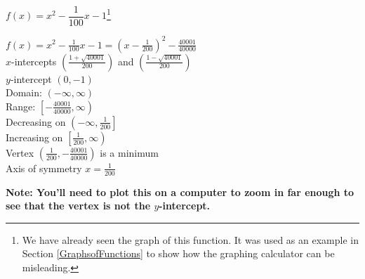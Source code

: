 {$f(x) = x^{2} - \dfrac{1}{100} x - 1$\footnote{We have already seen the graph of this function.  It was used as an example in Section \ref{GraphsofFunctions} to show how the graphing calculator can be misleading.}}
{$f(x) = x^{2} - \frac{1}{100} x - 1 = \left(x - \frac{1}{200}\right)^{2} - \frac{40001}{40000}$\\
$x$-intercepts $\left(\frac{1 + \sqrt{40001}}{200}\right)$ and $\left(\frac{1 - \sqrt{40001}}{200}\right)$\\
$y$-intercept $(0, -1)$\\
Domain: $(-\infty, \infty)$ \\
Range: $\left[-\frac{40001}{40000}, \infty \right)$ \\
Decreasing on $\left(-\infty, \frac{1}{200}\right]$ \\
Increasing on $\left[\frac{1}{200}, \infty \right)$ \\
Vertex $\left(\frac{1}{200}, -\frac{40001}{40000}\right)$ is a minimum\\
Axis of symmetry $x = \frac{1}{200}$

\begin{center}
\end{center}

\textbf{Note: You'll need to plot this on a computer to zoom in far enough to see that the vertex is not the $y$-intercept.}
}
